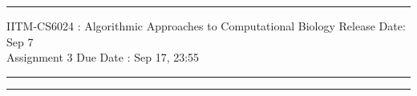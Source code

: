 \documentclass[solution,addpoints,12pt]{exam}
\begin{document}
\hrule
\vspace{3mm}
\noindent 
{\sf IITM-CS6024 : Algorithmic Approaches to Computational Biology  \hfill Release Date: Sep 7}
\vspace{3mm}\\
\noindent 
{\sf Assignment 3 \hfill Due Date : Sep 17, 23:55 }
\vspace{3mm}
\hrule
\vspace{3mm}



\vspace{3mm}

\hrule
\end{document}
